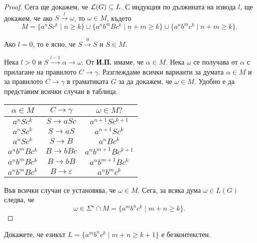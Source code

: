 \begin{proof}
  Сега ще докажем, че $\mathcal{L}(G) \subseteq L$.
  С индукция по дължината на извода $l$,
  ще докажем, че ако $S \stackrel{l}{\rightarrow}\omega$, то $\omega \in M$, където
  \[M = \{a^nSc^k\mid n\geq k\}\cup\{a^nb^mBc^k\mid n+m\geq k\}\cup\{a^nb^mc^k\mid n+m\geq k\}.\]
  
  Ако $l = 0$, то е ясно, че $S \stackrel{0}{\rightarrow} S$ и $S \in M$.

  Нека $l > 0$ и $S \stackrel{l-1}{\rightarrow} \alpha \rightarrow \omega$.
  От {\bf И.П.} имаме, че $\alpha \in M$. Нека $\omega$ се получава от $\alpha$ с прилагане на правилото $C \rightarrow \gamma$.
  Разглеждаме всички варианти за думата $\alpha \in M$ и за правилото $C\rightarrow \gamma$ в граматиката $G$
  за да докажем, че  $\omega \in M$.
  Удобно е да представим всички случаи в таблица.
  \begin{center}
    \begin{tabular}{| c | c | c |}
      \hline
      $\alpha\in M$ & $C \rightarrow \gamma$ & $\omega \in M?$ \\ \hline
      $a^nSc^k$ & $S \rightarrow aSc$ & $a^{n+1}Sc^{k+1}$ \\ \hline
      $a^nSc^k$ & $S \rightarrow aS$ & $a^{n+1}Sc^{k}$ \\ \hline
      $a^nSc^k$ & $S \rightarrow B$ & $a^{n}Bc^{k}$ \\ \hline
      $a^nb^mBc^k$ & $B \rightarrow bBc$ & $a^nb^{m+1}Bc^{k+1}$\\ \hline
      $a^nb^mBc^k$ & $B \rightarrow bB$ & $a^nb^{m+1}Bc^{k}$\\ \hline
      $a^nb^mBc^k$ & $B \rightarrow \varepsilon$ & $a^nb^{m}c^{k}$\\ \hline
    \end{tabular}
  \end{center}
  Във всички случаи се установява, че $\omega \in M$.
  Сега, за всяка дума $\omega \in L(G)$ следва, че
  \[\omega \in \Sigma^\star \cap M = \{a^mb^nc^k\mid m+n \geq k\}.\]
\end{proof}


\begin{problem}
  Докажете, че езикът $L = \{a^mb^nc^k\mid m+n \geq k + 1\}$ е безконтекстен.  
\end{problem}

